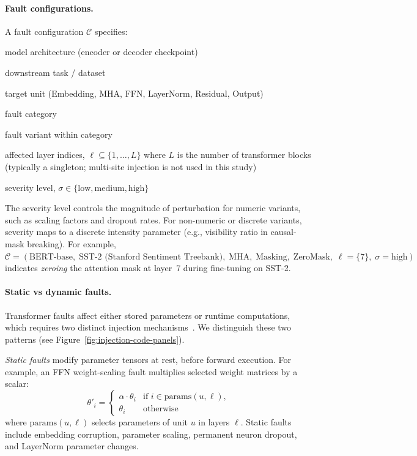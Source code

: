 \paragraph{Fault configurations.}

A fault configuration $\mathcal{C}$ specifies:
\begin{description}[leftmargin=1.6em,style=nextline,noitemsep]
  \item[$m$] model architecture (encoder or decoder checkpoint)
  \item[$t$] downstream task / dataset
  \item[$u$] target unit (Embedding, MHA, FFN, LayerNorm, Residual, Output)
  \item[$f$] fault category
  \item[$v$] fault variant within category
  \item[$\ell$] affected layer indices, $\ell \subseteq \{1,\dots,L\}$ where $L$ is the number of transformer blocks (typically a singleton; multi-site injection is not used in this study)
  \item[$\sigma$] severity level, $\sigma \in \{\mathrm{low}, \mathrm{medium}, \mathrm{high}\}$
\end{description}
The severity level controls the magnitude of perturbation for numeric variants, such as scaling factors and dropout rates. For non-numeric or discrete variants, severity maps to a discrete intensity parameter (e.g., visibility ratio in causal-mask breaking). For example, $\mathcal{C} = (\text{BERT-base},\; \text{SST-2 (Stanford Sentiment Treebank)},\; \text{MHA},\; \text{Masking},\; \text{ZeroMask},\; \ell=\{7\},\; \sigma=\text{high})$ indicates \emph{zeroing} the attention mask at layer~7 during fine-tuning on SST-2.

\paragraph{Static vs dynamic faults.}
Transformer faults affect either stored parameters or runtime computations, which requires two distinct injection mechanisms~\citep{pytorchfi,deepcrime}. We distinguish these two patterns (see Figure~\ref{fig:injection-code-panels}).

\emph{Static faults} modify parameter tensors at rest, before forward execution.
For example, an FFN weight-scaling fault multiplies selected weight matrices by a scalar:
\begin{equation}
\theta'_i =
\begin{cases}
\alpha \cdot \theta_i & \text{if } i \in \mathrm{params}(u,\ell),\\[0.2ex]
\theta_i & \text{otherwise}
\end{cases}
\label{eq:static-fault}
\end{equation}
where $\mathrm{params}(u,\ell)$ selects parameters of unit $u$ in layers $\ell$.
Static faults include embedding corruption, parameter scaling, permanent neuron dropout, and LayerNorm parameter changes.


